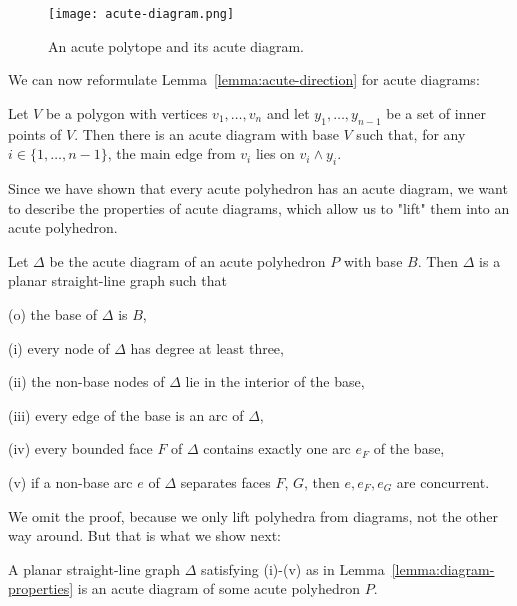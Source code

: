 \begin{figure}[h]
  \centering
  \texttt{[image: acute-diagram.png]}
  \caption{An acute polytope and its acute diagram. \cite[Figure 1 (cropped)]{shitov2020sublinear}}
  \label{fig:acute-diagram}
\end{figure}

We can now reformulate Lemma~\ref{lemma:acute-direction} for acute diagrams:

\begin{corollary}\label{corollary:acute-direction}
  Let $V$ be a polygon with vertices $v_1,\dots,v_n$ and let $y_1,\dots,y_{n-1}$ be a set of inner points of $V$.
  Then there is an acute diagram with base $V$ such that, for any $i \in \{1,\dots,n-1\}$, the main edge from $v_i$ lies on $v_i \wedge y_i$.
\end{corollary}

Since we have shown that every acute polyhedron has an acute diagram, we want to describe the properties of acute diagrams, which allow us to "lift" them into an acute polyhedron.

\begin{lemma}\label{lemma:diagram-properties}
  Let $\Delta$ be the acute diagram of an acute polyhedron $P$ with base $B$.
  Then $\Delta$ is a planar straight-line graph such that

  (o) the base of $\Delta$ is $B$,
  
  (i) every node of $\Delta$ has degree at least three,

  (ii) the non-base nodes of $\Delta$ lie in the interior of the base,

  (iii) every edge of the base is an arc of $\Delta$,

  (iv) every bounded face $F$ of $\Delta$ contains exactly one arc $e_F$ of the base,

  (v) if a non-base arc $e$ of $\Delta$ separates faces $F$, $G$, then $e, e_F, e_G$ are concurrent.
\end{lemma}

We omit the proof, because we only lift polyhedra from diagrams, not the other way around. But that is what we show next:

\begin{lemma}\label{lemma:lifting}
  A planar straight-line graph $\Delta$ satisfying (i)-(v) as in Lemma~\ref{lemma:diagram-properties} is an acute diagram of some acute polyhedron $P$.
\end{lemma}

